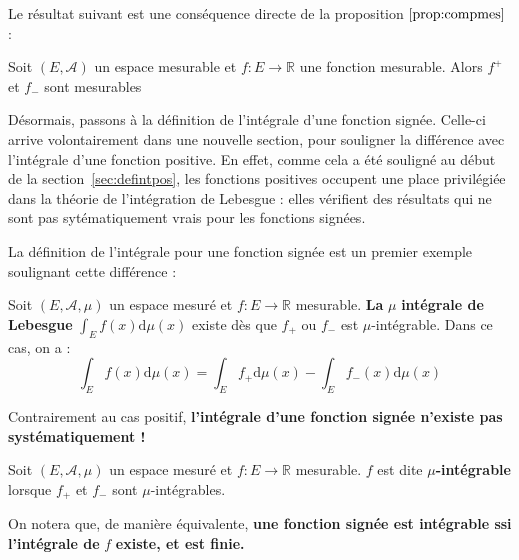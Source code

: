 \documentclass[../integ-proba.tex]{subfiles}
\begin{document}
  Le résultat suivant est une conséquence directe de la proposition $\ref{prop:compmes}$ :

  \begin{prop}
    \label{prop:partiemes}
    Soit $\left(E,\mathcal{A}\right)$ un espace mesurable et $f:E\longrightarrow\mathbb{R}$ une fonction mesurable.
    Alors $f^+$ et $f_-$ sont mesurables
  \end{prop}

  Désormais, passons à la définition de l'intégrale d'une fonction signée.
  Celle-ci arrive volontairement dans une nouvelle section, pour souligner la différence avec l'intégrale d'une fonction positive.
  En effet, comme cela a été souligné au début de la section~\ref{sec:defintpos}, les fonctions positives occupent une place privilégiée dans la théorie de l'intégration de Lebesgue : elles vérifient des résultats qui ne sont pas sytématiquement vrais pour les fonctions signées.

  La définition de l'intégrale pour une fonction signée est un premier exemple soulignant cette différence :

  \begin{defi}
    Soit $\left(E,\mathcal{A},\mu\right)$ un espace mesuré et $f:E\rightarrow\mathbb{R}$ mesurable.
    \textbf{La} $\mu$ \textbf{intégrale de Lebesgue} $\displaystyle\int_E f(x) \text{d}\mu(x)$ existe dès que $f_+$ ou $f_-$ est $\mu$-intégrable.
    Dans ce cas, on a :
    \begin{displaymath}
      \int_E f(x) \text{d}\mu(x)=\int_E f_+\text{d}\mu(x) - \int_E f_-(x)\text{d}\mu(x)
    \end{displaymath}
  \end{defi}

  \begin{rem}
    Contrairement au cas positif, \textbf{l'intégrale d'une fonction signée n'existe pas systématiquement !}
  \end{rem}

  \begin{defi}
    Soit $\left(E,\mathcal{A},\mu\right)$ un espace mesuré et $f:E\rightarrow\mathbb{R}$ mesurable.
    $f$ est dite $\mu$\textbf{-intégrable} lorsque $f_+$ et $f_-$ sont $\mu$-intégrables.
  \end{defi}

  \begin{rem}
    On notera que, de manière équivalente, \textbf{une fonction signée est intégrable ssi l'intégrale de} $f$ \textbf{existe, et est finie.}
  \end{rem}
\end{document}
